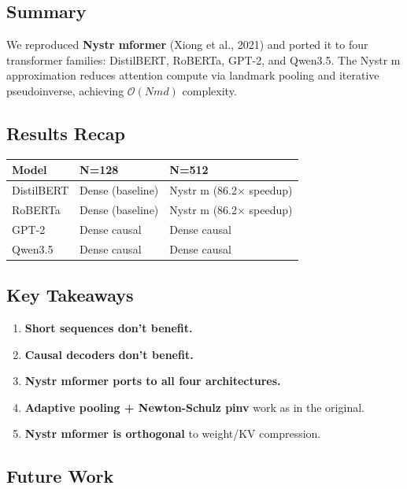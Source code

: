\subsection{Summary}

We reproduced \textbf{Nystr mformer} (Xiong et al., 2021) and ported it to 
four transformer families: DistilBERT, RoBERTa, GPT-2, and Qwen3.5. 
The Nystr m approximation reduces attention compute via landmark pooling 
and iterative pseudoinverse, achieving $\mathcal{O}(N m d)$ complexity.

\subsection{Results Recap}

\begin{table}[H]
\centering
\small
\begin{tabular}{lll}
\toprule
\textbf{Model} & \textbf{N=128} & \textbf{N=512} \\
\midrule
DistilBERT & Dense (baseline) & Nystr m (86.2$\times$ speedup) \\
RoBERTa & Dense (baseline) & Nystr m (86.2$\times$ speedup) \\
GPT-2 & Dense causal & Dense causal \\
Qwen3.5 & Dense causal & Dense causal \\
\bottomrule
\end{tabular}
\end{table}

\subsection{Key Takeaways}

\begin{enumerate}
\item \textbf{Short sequences don't benefit.}
\item \textbf{Causal decoders don't benefit.}
\item \textbf{Nystr mformer ports to all four architectures.}
\item \textbf{Adaptive pooling + Newton-Schulz pinv} work as in the original.
\item \textbf{Nystr mformer is orthogonal} to weight/KV compression.

\end{enumerate}
\subsection{Future Work}

